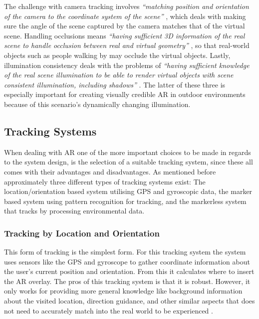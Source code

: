 The challenge with camera tracking involves \textit{“matching position and orientation of the camera to the coordinate system of the scene”} \cite{Lal2010}, which deals with making sure the angle of the scene captured by the camera matches that of the virtual scene. Handling occlusions means \textit{“having sufficient 3D information of the real scene to handle occlusion between real and virtual geometry”} \cite{Lal2010}, so that real-world objects such as people walking by may occlude the virtual objects. Lastly, illumination consistency deals with the problems of \textit{“having sufficient knowledge of the real scene illumination to be able to render virtual objects with scene consistent illumination, including shadows”} \cite{Lal2010}. The latter of these three is especially important for creating visually credible AR in outdoor environments because of this scenario’s dynamically changing illumination.

\subsection{Tracking Systems}  
When dealing with AR one of the more important choices to be made in regards to the system design, is the selection of a suitable tracking system, since these all comes with their advantages and disadvantages. As mentioned before approximately three different types of tracking systems exist: The location/orientation based system utilising GPS and gyroscopic data, the marker based system using pattern recognition for tracking, and the markerless system that tracks by processing environmental data.    

\subsubsection{Tracking by Location and Orientation}
This form of tracking is the simplest form. For this tracking system the system uses sensors like the GPS and gyroscope to gather coordinate information about the user’s current position and orientation. From this it calculates where to insert the AR overlay. The pros of this tracking system is that it is robust. However, it only works for providing more general knowledge like background information about the visited location, direction guidance, and other similar aspects that does not need to accurately match into the real world to be experienced \cite{Woodford}.

